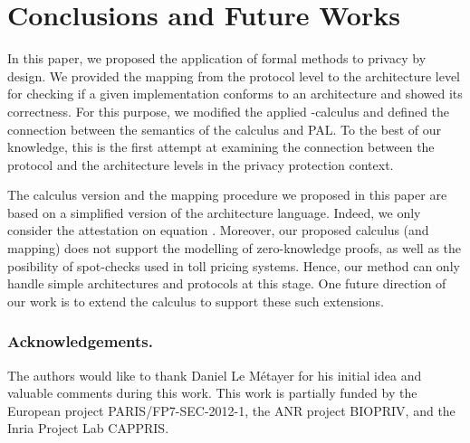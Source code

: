 \documentclass{llncs}
\begin{document}
 
\section{Conclusions and Future Works}
\label{sec:conclusion} 
In this paper, we proposed the application of formal methods to privacy by design. 
We provided the mapping from the protocol level to the architecture level for checking 
if a given implementation conforms to an architecture and showed its correctness. 
For this purpose, we modified the applied -calculus and 
defined the connection between the semantics of the calculus and PAL. To the best of our 
knowledge, this is the first attempt at examining the connection between the protocol 
and the architecture levels in the privacy protection context. 
   
The calculus version and the mapping procedure we proposed in this paper are based on a simplified 
version of the architecture language. Indeed, we only consider the attestation on equation 
  . Moreover, our proposed calculus (and mapping) does not support the modelling of 
zero-knowledge proofs, as well as the posibility of spot-checks used in toll pricing systems.  
Hence, our method can only handle simple architectures and protocols at this stage. 
One future direction of our work is to extend the calculus to support 
these such extensions. 

\subsubsection{Acknowledgements.}
The authors would like to thank Daniel Le M\'etayer for his initial idea and valuable comments during this work. 
This work is partially funded by the European project PARIS/FP7-SEC-2012-1, the ANR project BIOPRIV, and 
the Inria Project Lab CAPPRIS. 



\end{document}
